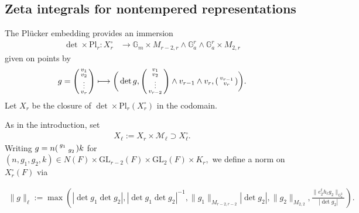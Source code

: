 \documentclass[12pt]{amsart}
\theoremstyle{remark}
\numberwithin{equation}{section}
\newcommand{\GL}{\mathrm{GL}}
\newcommand{\lto}{\longrightarrow}
\newcommand{\GG}{\mathbb{G}}
\newcommand{\quash}[1]{}
\theoremstyle{definition}
\newenvironment{psmatrix}
  {\left(\begin{smallmatrix}}
  {\end{smallmatrix}\right)}
\numberwithin{equation}{subsection}
\newcommand{\norm}[1]{\lVert#1\rVert}
\begin{document}
\subsection{Zeta integrals for nontempered representations} \label{zeta:nontemp}
The Pl\"ucker embedding provides an immersion
\begin{align} \label{embed0}
\det \times \mathrm{Pl}_r:X_r^\circ  &\lto \GG_m \times M_{r-2,r}\wedge \GG_a^r\wedge \GG_a^r\times M_{2,r}
\end{align}
given on points by 
$$
g=\begin{psmatrix}
        v_1\\
        v_2\\
        \vdots \\
         v_{r}
    \end{psmatrix}\longmapsto \bigg(\det g,\begin{psmatrix}
        v_1\\
        v_2\\
        \vdots \\
         v_{r-2}
    \end{psmatrix}\wedge v_{r-1}\wedge v_{r},\begin{psmatrix}
        v_{r-1}\\
         v_{r}
    \end{psmatrix}\bigg).
$$
Let $X_r$ be the closure of $\det \times \mathrm{Pl}_r(X_r^\circ)$ in the codomain.




As in the introduction, set
\begin{align*}
X_\ell:=X_{r} \times \mathcal{M}_\ell \supset X_\ell^\circ.
\end{align*} 
Writing 
$g=n\begin{psmatrix}
    g_1 & \\
    & g_2
\end{psmatrix}k$ for $(n,g_1,g_2,k) \in N(F) \times \GL_{r-2}(F) \times \GL_2(F) \times K_r,$ we define a norm on $X_r^\circ(F)$ via
\quash{\begin{align} \label{gnorm}
    \norm{g}_\ell:=\max\left(|\det g_1\det g_2|,|\det g_1\det g_2|^{-1},\norm{g_1}_{M_{r-2,r-2}}|\det g_2|,\norm{g_2}_{M_{2,2}}\right).
\end{align}}
\begin{align} \label{gnorm}
    \norm{g}_\ell:=\max\left(|\det g_1\det g_2|,|\det g_1\det g_2|^{-1},\norm{g_1}_{M_{r-2,r-2}}|\det g_2|,\norm{g_2}_{M_{2,2}},\frac{\norm{e_2^t h_\ell g_2}_{\GG_a^2}}{|\det g_2|}\right).
\end{align}
\end{document}
